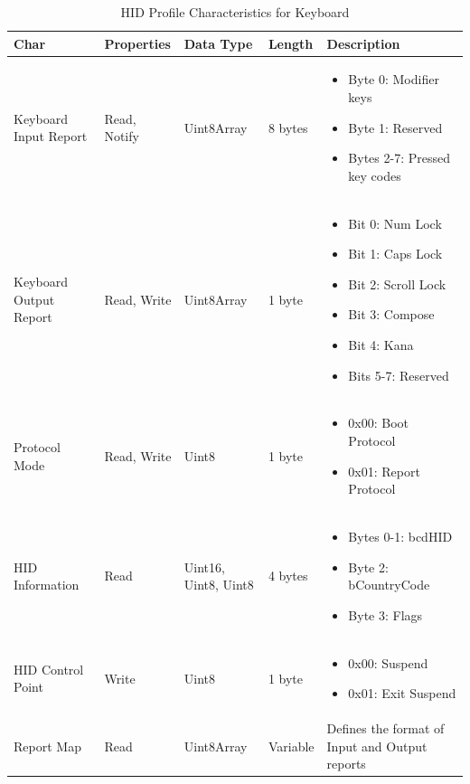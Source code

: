 \documentclass[a4paper,11pt]{article}%
\begin{document}
\begin{table}[H]
    \centering
    
    \begin{tabular}{|p{2.5cm}|p{2cm}|p{2cm}|p{1.2cm}|p{6cm}|}
    \hline
    \textbf{Char} & \textbf{Properties} & \textbf{Data Type} & \textbf{Length} & \textbf{Description} \\
    \hline
    Keyboard Input Report & Read, Notify & Uint8Array & 8 bytes & 
    \begin{itemize}
        \item Byte 0: Modifier keys
        \item Byte 1: Reserved
        \item Bytes 2-7: Pressed key codes
    \end{itemize} \\
    \hline
    Keyboard Output Report & Read, Write & Uint8Array & 1 byte & 
    \begin{itemize}
        \item Bit 0: Num Lock
        \item Bit 1: Caps Lock
        \item Bit 2: Scroll Lock
        \item Bit 3: Compose
        \item Bit 4: Kana
        \item Bits 5-7: Reserved
    \end{itemize} \\
    \hline
    Protocol Mode & Read, Write & Uint8 & 1 byte & 
    \begin{itemize}
        \item 0x00: Boot Protocol
        \item 0x01: Report Protocol
    \end{itemize} \\
    \hline
    HID Information & Read & Uint16, Uint8, Uint8 & 4 bytes & 
    \begin{itemize}
        \item Bytes 0-1: bcdHID
        \item Byte 2: bCountryCode
        \item Byte 3: Flags
    \end{itemize} \\
    \hline
    HID Control Point & Write & Uint8 & 1 byte & 
    \begin{itemize}
        \item 0x00: Suspend
        \item 0x01: Exit Suspend
    \end{itemize} \\
    \hline
    Report Map & Read & Uint8Array & Variable & Defines the format of Input and Output reports \\
    \hline
    \end{tabular}
    \caption{HID Profile Characteristics for Keyboard}
    \end{table}
\end{document}

